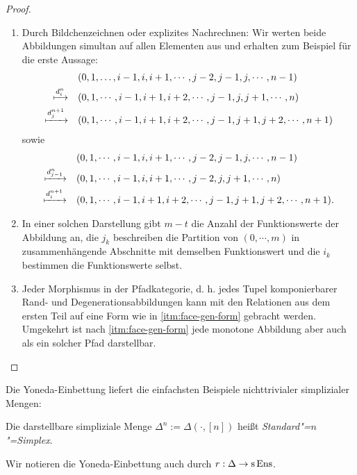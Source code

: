 \begin{proof}
  \begin{enumerate}[label=(\roman*)]
  \item Durch Bildchenzeichnen oder explizites Nachrechnen: Wir werten
    beide Abbildungen simultan auf allen Elementen aus und erhalten
    zum Beispiel für die erste Aussage:
  \begin{align*}
  &(0, 1, \dots, i-1, i, i+1, \cdots, j-2, j-1, j, \cdots, n-1) \\
  \xmapsto{d_i^n} \quad
  &(0, 1, \cdots, i-1, i+1, i+2, \cdots, j-1, j, j+1, \cdots, n) \\
  \xmapsto{d_j^{n+1}} \quad
  &(0, 1, \cdots, i-1, i+1, i+2, \cdots, j-1, j+1, j+2, \cdots, n+1)
  \end{align*}
  sowie
  \begin{align*}
  &(0, 1, \cdots, i-1, i, i+1, \cdots, j-2, j-1, j, \cdots, n-1) \\
  \xmapsto{d_{j-1}^n} \quad
  &(0, 1, \cdots, i-1, i, i+1, \cdots, j-2, j, j+1, \cdots, n) \\
  \xmapsto{d_i^{n+1}} \quad
  &(0, 1, \cdots, i-1, i+1, i+2, \cdots, j-1, j+1, j+2, \cdots, n+1).
  \end{align*}

  \item In einer solchen Darstellung gibt $m - t$ die Anzahl der
  Funktionswerte der Abbildung an, die $j_k$ beschreiben die Partition
  von $(0, \cdots, m)$ in zusammenhängende Abschnitte mit demselben
  Funktionswert und die $i_k$ bestimmen die Funktionswerte selbst.

  \item Jeder Morphismus in der Pfadkategorie, d. h. jedes Tupel
    komponierbarer Rand- und Degenerationsabbildungen kann mit den
    Relationen aus dem ersten Teil auf eine Form wie in
    \ref{itm:face-gen-form} gebracht werden. Umgekehrt ist nach
    \ref{itm:face-gen-form} jede monotone Abbildung aber auch als ein
    solcher Pfad darstellbar.
\end{enumerate}
\end{proof}

Die Yoneda-Einbettung liefert die einfachsten Beispiele nichttrivialer
simplizialer Mengen:
\begin{defn} \label{def:comb-standard-simplex}
  Die darstellbare simpliziale Menge $\Delta^n := \Delta(\cdot, [n])$
  heißt \emph{Standard"=$n$"=Simplex}.
\end{defn}
Wir notieren die Yoneda-Einbettung auch durch $r: \Delta \to \operatorname{s}\operatorname{Ens}$.

